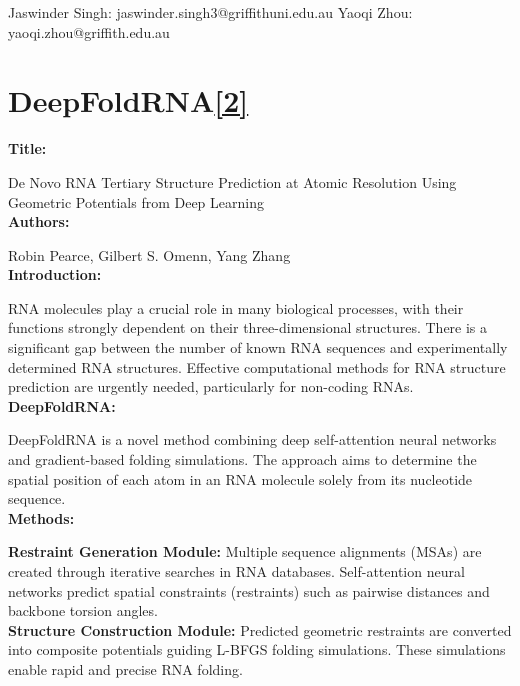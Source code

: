 \documentclass{article}
\begin{document}
\begin{large}
\begin{large}
\begin{large}
Jaswinder Singh: jaswinder.singh3@griffithuni.edu.au
Yaoqi Zhou: yaoqi.zhou@griffith.edu.au\\[0.5em]

\clearpage

\section{DeepFoldRNA\href{https://doi.org/10.1101/2022.05.15.491755}{\textbf{[2]}}}

\textbf{Title:}\par
De Novo RNA Tertiary Structure Prediction at Atomic Resolution Using Geometric Potentials from Deep Learning\\[0.5em]

\textbf{Authors:}\par
Robin Pearce, Gilbert S. Omenn, Yang Zhang\\[0.5em]

\textbf{Introduction:}\par

RNA molecules play a crucial role in many biological processes, with their functions strongly dependent on their three-dimensional structures.
There is a significant gap between the number of known RNA sequences and experimentally determined RNA structures.
Effective computational methods for RNA structure prediction are urgently needed, particularly for non-coding RNAs.\\[0.5em]

\textbf{DeepFoldRNA:}\par

DeepFoldRNA is a novel method combining deep self-attention neural networks and gradient-based folding simulations.
The approach aims to determine the spatial position of each atom in an RNA molecule solely from its nucleotide sequence.\\[0.5em]

\textbf{Methods:}\par

\textbf{Restraint Generation Module:}
    Multiple sequence alignments (MSAs) are created through iterative searches in RNA databases.
    Self-attention neural networks predict spatial constraints (restraints) such as pairwise distances and backbone torsion angles.\\[0.5em]
\textbf{Structure Construction Module:}
    Predicted geometric restraints are converted into composite potentials guiding L-BFGS folding simulations.
    These simulations enable rapid and precise RNA folding.\\[0.5em]


\end{large}
\end{large}
\end{large}
\end{document}
